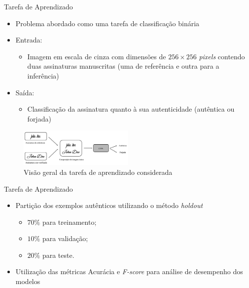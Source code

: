 
\begin{frame}{Tarefa de Aprendizado}
  \baselineskip
	\begin{itemize}
	\item Problema abordado como uma \alert{tarefa de classificação binária}
	\item \alert{Entrada:}
	\begin{itemize}
		\item Imagem em escala de cinza com dimensões de $256 \times 256$ \emph{pixels} contendo duas assinaturas manuscritas (uma de referência e outra para a inferência)
	\end{itemize}
	\item \alert{Saída:}
	\begin{itemize}
		\item Classificação da assinatura quanto à sua autenticidade (autêntica ou forjada)
	\end{itemize}
	\end{itemize}

	\begin{figure}
		\caption{Visão geral da tarefa de aprendizado considerada}
		\label{fig:esquema-solucao}
		\includegraphics[width=0.5\textwidth]{img/esquema-solucao}
	\end{figure}
\end{frame}

\begin{frame}{Tarefa de Aprendizado}

\begin{itemize}
  \item Partição dos exemplos \alert{autênticos} utilizando o método \emph{holdout}
    \begin{itemize}
      \item $70\%$ para treinamento;
      \item $10\%$ para validação;
      \item $20\%$ para teste.
    \end{itemize}
  \bigskip
  \item Utilização das métricas Acurácia e \emph{F-score} para análise de desempenho dos modelos
\end{itemize}

\end{frame}

